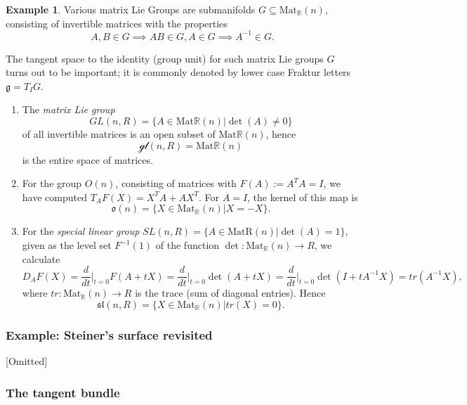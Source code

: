 \documentclass{article}
\theoremstyle{definition}
\newtheorem{example}[theorem]{Example}
\begin{document}
\begin{example}

Various matrix Lie Groups are submanifolds $G \subseteq \text{Mat}_{\mathbb R}(n)$, consisting of invertible matrices with the properties
\[
    A,B \in G \implies AB \in G, A \in G \implies A^{-1} \in G.
\]

The tangent space to the identity (group unit) for such matrix Lie groups $G$ turns out to be important; it is commonly denoted by lower case Fraktur letters $\mathfrak {g} = T_I G$.

\begin{enumerate}
    \item The \textit{matrix Lie group} 
    \[
        GL(n,R) = \{A \in \text{Mat} \mathbb R(n) | \det(A) \neq 0 \}
    \]
    of all invertible matrices is an open subset of $\text{Mat} \mathbb R(n)$, hence 
    \[
        \mathscr{gl}(n,R) = \text{Mat} \mathbb R(n)
    \]
    is the entire space of matrices.
    
    \item For the group $O(n)$, consisting of matrices with $F(A) := A ^T A = I$, we have computed $T_A F(X) = X^T A + AX ^T$. For $A = I$, the kernel of this map is 
    \[\mathfrak{o}(n) = \{ X \in \text{Mat}_\mathbb R(n) | X = -X \}.\]
    
    \item For the \textit{special linear group} $SL(n,R) = \{A \in \text{MatR}(n)| \det(A) = 1\}$, given as the level set $F^{-1}(1)$ of the function $\det : \text{Mat}_\mathbb R(n) \rightarrow R$, we calculate 
    \[
        D_A F(X) = \frac{d}{dt} \Bigr |_{t=0} F(A+tX) =  \frac{d}{dt} \Bigr |_{t=0} \det(A+tX) = \frac{d}{dt} \Bigr |_{t=0} \det(I+tA^{-1}X) = tr(A^{-1} X),
    \]
    where $tr : \text{Mat}_\mathbb R(n) \rightarrow R$ is the trace (sum of diagonal entries). Hence 
    \[ \mathfrak{sl}(n,R) = \{X \in \text{Mat}_\mathbb R (n)| tr(X) = 0 \}.\]
\end{enumerate}

\end{example}

\subsubsection{Example: Steiner’s surface revisited}

[Omitted]

\subsubsection{The tangent bundle}
\end{document}
